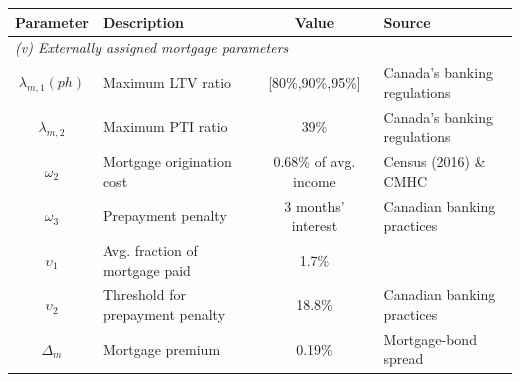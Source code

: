 \begin{table}[p]
\footnotesize
\renewcommand{\arraystretch}{1.2}
\begin{center}
\begin{tabular}{clcl}\toprule
Parameter & Description & Value & Source\\
\midrule
\multicolumn{4}{l}{\textit{(v) Externally assigned mortgage parameters}}\\
\midrule
$\lambda_{m,1}(ph)$ & Maximum LTV ratio & [80\%,90\%,95\%] & Canada's banking regulations \\
$\lambda_{m,2}$ & Maximum PTI ratio & 39\% & Canada's banking regulations \\
$\omega_{2}$ & Mortgage origination cost & 0.68\% of avg. income & Census (2016) \& CMHC \\
$\omega_{3}$ & Prepayment penalty & 3 months' interest & Canadian banking practices \\
$\upsilon_{1}$ & Avg. fraction of mortgage paid & 1.7\% & \citet{kkk-2021} \\
$\upsilon_{2}$ & Threshold for prepayment penalty & 18.8\% & Canadian banking practices \\
$\Delta_{m}$ & Mortgage premium & 0.19\% & Mortgage-bond spread \\
\bottomrule
\bottomrule
\end{tabular}
\end{center}
\normalsize
\end{table}

